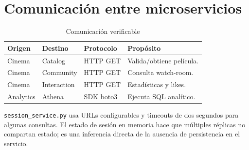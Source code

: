 \chapter{Comunicación entre microservicios}\begin{table}[H]\centering\caption{Comunicación verificable}\begin{tabularx}{\textwidth}{lllX}\toprule Origen&Destino&Protocolo&Propósito\\\midrule Cinema&Catalog&HTTP GET&Valida/obtiene película.\\Cinema&Community&HTTP GET&Consulta watch-room.\\Cinema&Interaction&HTTP GET&Estadísticas y likes.\\Analytics&Athena&SDK boto3&Ejecuta SQL analítico.\\\bottomrule\end{tabularx}\end{table}\texttt{session\_service.py} usa URLs configurables y timeouts de dos segundos para algunas consultas. El estado de sesión en memoria hace que múltiples réplicas no compartan estado; es una inferencia directa de la ausencia de persistencia en el servicio.

